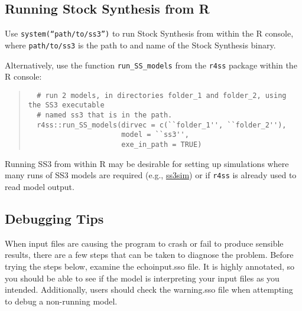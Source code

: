 \subsection{Running Stock Synthesis from R}

Use \texttt{system(``path/to/ss3'')} to run Stock Synthesis from within the R console, where \texttt{path/to/ss3} is the path to and name of the Stock Synthesis binary.

Alternatively, use the function \texttt{run\_SS\_models} from the \texttt{r4ss} package within the R console:

\begin{quote}
  \begin{verbatim}
  # run 2 models, in directories folder_1 and folder_2, using the SS3 executable
  # named ss3 that is in the path.
  r4ss::run_SS_models(dirvec = c(``folder_1'', ``folder_2''),
                      model = ``ss3'',
                      exe_in_path = TRUE)
  \end{verbatim}
\end{quote}

Running SS3 from within R may be desirable for setting up simulations where many runs of SS3 models are required (e.g., \href{https://github.com/ss3sim/ss3sim}{ss3sim}) or if \texttt{r4ss} is already used to read model output.


\subsection{Debugging Tips}
When input files are causing the program to crash or fail to produce sensible results, there are a few steps that can be taken to diagnose the problem.  Before trying the steps below, examine the echoinput.sso file.  It is highly annotated, so you should be able to see if the model is interpreting your input files as you intended.  Additionally, users should check the warning.sso file when attempting to debug a non-running model.

